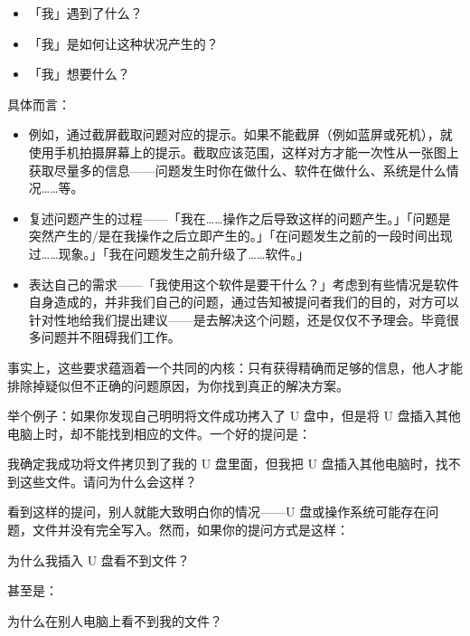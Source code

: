 \begin{itemize}
  \item 「我」遇到了什么？
  \item 「我」是如何让这种状况产生的？
  \item 「我」想要什么？
\end{itemize}

具体而言：

\begin{itemize}
  \item {}例如，通过截屏截取问题对应的提示。如果不能截屏（例如蓝屏或死机），就使用手机拍摄屏幕上的提示。截取应该范围，这样对方才能一次性从一张图上获取尽量多的信息——问题发生时你在做什么、软件在做什么、系统是什么情况……等。
  \item {}复述问题产生的过程——「我在……操作之后导致这样的问题产生。」「问题是突然产生的/是在我操作之后立即产生的。」「在问题发生之前的一段时间出现过……现象。」「我在问题发生之前升级了……软件。」
  \item {}表达自己的需求——「我使用这个软件是要干什么？」考虑到有些情况是软件自身造成的，并非我们自己的问题，通过告知被提问者我们的目的，对方可以针对性地给我们提出建议——是去解决这个问题，还是仅仅不予理会。毕竟很多问题并不阻碍我们工作。
\end{itemize}

事实上，这些要求蕴涵着一个共同的内核：只有获得精确而足够的信息，他人才能排除掉疑似但不正确的问题原因，为你找到真正的解决方案。

举个例子：如果你发现自己明明将文件成功拷入了 U 盘中，但是将 U 盘插入其他电脑上时，却不能找到相应的文件。一个好的提问是：

\begin{quoting}
  我确定我成功将文件拷贝到了我的 U 盘里面，但我把 U 盘插入其他电脑时，找不到这些文件。请问为什么会这样？
\end{quoting}

看到这样的提问，别人就能大致明白你的情况——U 盘或操作系统可能存在问题，文件并没有完全写入。然而，如果你的提问方式是这样：

\begin{quoting}
  为什么我插入 U 盘看不到文件？
\end{quoting}

甚至是：

\begin{quoting}
  为什么在别人电脑上看不到我的文件？
\end{quoting}

